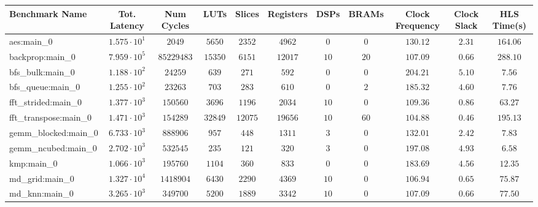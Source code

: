 \begin{tabular}{|l|c|c|c|c|c|c|c|c|c|c|}
\hline
Benchmark Name         & Tot. Latency           & Num Cycles   & LUTs      & Slices    & Registers & DSPs    & BRAMs  & Clock Frequency & Clock Slack & HLS Time(s) \\
\hline
aes:main\_0            & $ 1.575 \cdot 10^{1} $ & $ 2049     $ & $ 5650  $ & $ 2352  $ & $ 4962  $ & $ 0   $ & $ 0  $ & $ 130.12      $ & $ 2.31    $ & $ 164.06  $ \\
backprop:main\_0       & $ 7.959 \cdot 10^{5} $ & $ 85229483 $ & $ 15350 $ & $ 6151  $ & $ 12017 $ & $ 10  $ & $ 20 $ & $ 107.09      $ & $ 0.66    $ & $ 288.10  $ \\
bfs\_bulk:main\_0      & $ 1.188 \cdot 10^{2} $ & $ 24259    $ & $ 639   $ & $ 271   $ & $ 592   $ & $ 0   $ & $ 0  $ & $ 204.21      $ & $ 5.10    $ & $ 7.56    $ \\
bfs\_queue:main\_0     & $ 1.255 \cdot 10^{2} $ & $ 23263    $ & $ 703   $ & $ 283   $ & $ 610   $ & $ 0   $ & $ 2  $ & $ 185.32      $ & $ 4.60    $ & $ 7.76    $ \\
fft\_strided:main\_0   & $ 1.377 \cdot 10^{3} $ & $ 150560   $ & $ 3696  $ & $ 1196  $ & $ 2034  $ & $ 10  $ & $ 0  $ & $ 109.36      $ & $ 0.86    $ & $ 63.27   $ \\
fft\_transpose:main\_0 & $ 1.471 \cdot 10^{3} $ & $ 154289   $ & $ 32849 $ & $ 12075 $ & $ 19656 $ & $ 10  $ & $ 60 $ & $ 104.88      $ & $ 0.46    $ & $ 195.13  $ \\
gemm\_blocked:main\_0  & $ 6.733 \cdot 10^{3} $ & $ 888906   $ & $ 957   $ & $ 448   $ & $ 1311  $ & $ 3   $ & $ 0  $ & $ 132.01      $ & $ 2.42    $ & $ 7.83    $ \\
gemm\_ncubed:main\_0   & $ 2.702 \cdot 10^{3} $ & $ 532545   $ & $ 235   $ & $ 121   $ & $ 320   $ & $ 3   $ & $ 0  $ & $ 197.08      $ & $ 4.93    $ & $ 6.58    $ \\
kmp:main\_0            & $ 1.066 \cdot 10^{3} $ & $ 195760   $ & $ 1104  $ & $ 360   $ & $ 833   $ & $ 0   $ & $ 0  $ & $ 183.69      $ & $ 4.56    $ & $ 12.35   $ \\
md\_grid:main\_0       & $ 1.327 \cdot 10^{4} $ & $ 1418904  $ & $ 6430  $ & $ 2290  $ & $ 4369  $ & $ 10  $ & $ 0  $ & $ 106.94      $ & $ 0.65    $ & $ 75.87   $ \\
md\_knn:main\_0        & $ 3.265 \cdot 10^{3} $ & $ 349700   $ & $ 5200  $ & $ 1889  $ & $ 3342  $ & $ 10  $ & $ 0  $ & $ 107.09      $ & $ 0.66    $ & $ 77.50   $ \\

\end{tabular}
